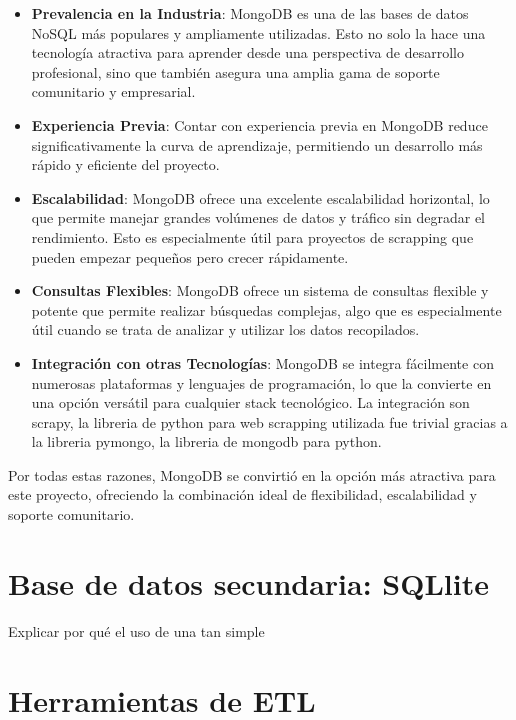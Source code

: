 \begin{itemize}
\item \textbf{Prevalencia en la Industria}: MongoDB es una de las bases de datos NoSQL más populares y ampliamente utilizadas. Esto no solo la hace una tecnología atractiva para aprender desde una perspectiva de desarrollo profesional, sino que también asegura una amplia gama de soporte comunitario y empresarial.

\item \textbf{Experiencia Previa}: Contar con experiencia previa en MongoDB reduce significativamente la curva de aprendizaje, permitiendo un desarrollo más rápido y eficiente del proyecto.

\item \textbf{Escalabilidad}: MongoDB ofrece una excelente escalabilidad horizontal, lo que permite manejar grandes volúmenes de datos y tráfico sin degradar el rendimiento. Esto es especialmente útil para proyectos de scrapping que pueden empezar pequeños pero crecer rápidamente.

\item \textbf{Consultas Flexibles}: MongoDB ofrece un sistema de consultas flexible y potente que permite realizar búsquedas complejas, algo que es especialmente útil cuando se trata de analizar y utilizar los datos recopilados.

\item \textbf{Integración con otras Tecnologías}: MongoDB se integra fácilmente con numerosas plataformas y lenguajes de programación, lo que la convierte en una opción versátil para cualquier stack tecnológico. La integración son scrapy, la libreria de python para web scrapping utilizada fue trivial gracias a la libreria pymongo, la libreria de mongodb para python.
\end{itemize}

Por todas estas razones, MongoDB se convirtió en la opción más atractiva para este proyecto, ofreciendo la combinación ideal de flexibilidad, escalabilidad y soporte comunitario.

\section{Base de datos secundaria: SQLlite}

Explicar por qué el uso de una tan simple

\section{Herramientas de ETL}

